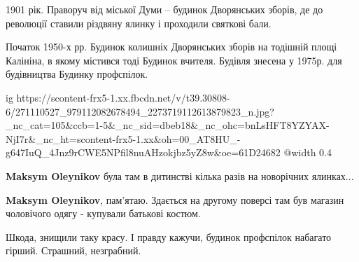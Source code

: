  
 
 
 
 


1901 рік. Праворуч від міської Думи – будинок Дворянських зборів, де до
революції ставили різдвяну ялинку і проходили святкові бали.


Початок 1950-х рр. Будинок колишніх Дворянських зборів на тодішній площі
Калініна, в якому містився тоді Будинок вчителя. Будівля знесена у 1975р. для
будівництва Будинку профспілок.

\ifcmt
  ig https://scontent-frx5-1.xx.fbcdn.net/v/t39.30808-6/271110527_979112082678494_2273719112613879823_n.jpg?_nc_cat=105&ccb=1-5&_nc_sid=dbeb18&_nc_ohc=bnLsHFT8YZYAX-NjI7r&_nc_ht=scontent-frx5-1.xx&oh=00_AT8HU_-g647IuQ_4Jnz9rCWE5NPfil8nuAHzokjbz5yZ8w&oe=61D24682
  @width 0.4
\fi

\textbf{Maksym Oleynikov} була там в дитинстві кілька разів на новорічних ялинках...

\textbf{Maksym Oleynikov}, пам'ятаю. Здається на другому поверсі там був магазин чоловічого одягу - купували батькові костюм.


Шкода, знищили таку красу. І правду кажучи, будинок профспілок набагато гірший.
Страшний, незграбний.
